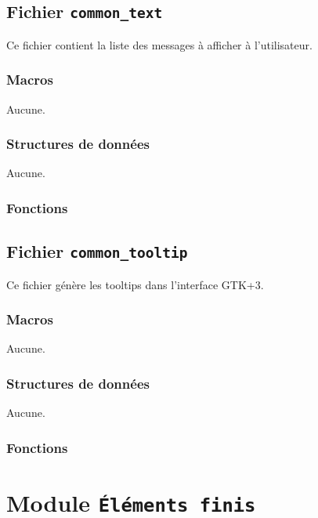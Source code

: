 \documentclass{article}
\begin{document}
\subsection{Fichier {\texttt{common\_text}}}
Ce fichier contient la liste des messages à afficher à l'utilisateur.
\subsubsection{Macros}
Aucune.
\subsubsection{Structures de données}
Aucune.
\subsubsection{Fonctions}
\noindent\hrulefill




\subsection{Fichier {\texttt{common\_tooltip}}}
Ce fichier génère les tooltips dans l'interface GTK+3.
\subsubsection{Macros}
Aucune.
\subsubsection{Structures de données}
Aucune.
\subsubsection{Fonctions}
\noindent\hrulefill


\section{Module {\texttt{Éléments finis}}}
\end{document}
